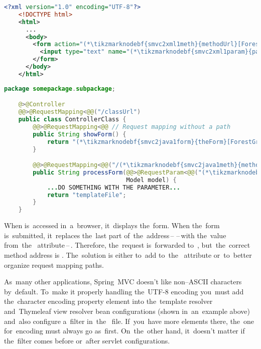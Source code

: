 \begin{lstlisting}[language=XML, title={Simple HTML form \tikzmarknodebf{smvc2xml1form}{\textit{theForm}}\textit{.html}}]
    <?xml version="1.0" encoding="UTF-8"?>
    <!DOCTYPE html>
    <html>
      ...
      <body>
        <form action="(*\tikzmarknodebf{smvc2xml1meth}{methodUrl}[ForestGreen]*)" method="post">
          <input type="text" name="(*\tikzmarknodebf{smvc2xml1param}{paramKey}[ForestGreen]*)">
        </form>
      </body>
    </html>
\end{lstlisting}
\begin{lstlisting}[language=Java, title={Controller class}]
    package somepackage.subpackage;

    @>@Controller
    @@>@RequestMapping<@@("/classUrl")
    public class ControllerClass {
        @@>@RequestMapping<@@ // Request mapping without a path
        public String showForm() {
            return "(*\tikzmarknodebf{smvc2java1form}{theForm}[ForestGreen]*)"
        }

        @@>@RequestMapping<@@("/(*\tikzmarknodebf{smvc2java1meth}{methodUrl}[ForestGreen]*)")
        public String processForm(@@>@RequestParam<@@("(*\tikzmarknodebf{smvc2java1param}{paramKey}[ForestGreen]*)") String singleParameter,
                                  Model model) {
            ...DO SOMETHING WITH THE PARAMETER...
            return "templateFile";
        }
    }
\end{lstlisting}

\noindent When  is~accessed in~a~browser, it~displays the~form.
When the~form is~submitted, it~replaces the~last part of~the~address\,--\,\,--\,with the~value from~the~ attribute\,--\,.
Therefore, the~request is~forwarded to~, but~the~correct method address is .
The~solution is either to~add  to~the~ attribute or~to~better organize request mapping paths.
\newpage

As~many other applications, Spring~MVC doesn't like non--ASCII characters by~default.
To~make it properly handling the~UTF-8 encoding you~must add the~character encoding property element into the~template resolver and~Thymeleaf view resolver bean configurations (shown in~an~example above) and~also configure a~filter in~the~ file.
If~you~have more  elements there, the~one for~encoding must always go as~first.
On~the~other hand, it~doesn't matter if the~filter comes before or~after servlet configurations.

